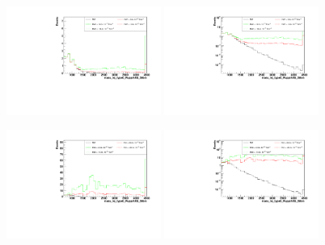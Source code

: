 \begin{figure}[h]
  \begin{center}
	\includegraphics[width=0.45\textwidth]{Plots/aQGC_kinematics/mass_lvj_type0_PuppiAK8_39bin_FM7.pdf}%
	\includegraphics[width=0.45\textwidth]{Plots/aQGC_kinematics/mass_lvj_type0_PuppiAK8_39bin_FM7_log.pdf}\\	
    \caption{}
  \end{center}
\end{figure}
\begin{figure}[h]
  \begin{center}
	\includegraphics[width=0.45\textwidth]{Plots/aQGC_kinematics/mass_lvj_type0_PuppiAK8_39bin_FS0.pdf}%
	\includegraphics[width=0.45\textwidth]{Plots/aQGC_kinematics/mass_lvj_type0_PuppiAK8_39bin_FS0_log.pdf}\\	
    \caption{}
  \end{center}
\end{figure}
